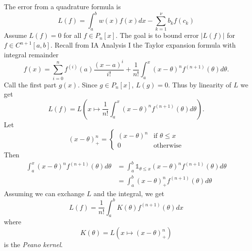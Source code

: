 \documentclass[a4paper]{article}
\begin{document}
The error from a quadrature formula is
\[
  L(f) = \int_a^b w(x)f(x) dx - \sum_{k = 1}^\nu b_kf(c_k)
\]
Assume \(L(f) = 0\) for all \(f \in P_n[x]\). The goal is to bound error \(|L(f)|\) for \(f \in C^{n + 1}[a, b]\). Recall from IA Analysis I the Taylor expansion formula with integral remainder
\[
  f(x) = \sum_{i = 0}^n f^{(i)}(a) \frac{(x - a)^i}{i!} + \frac{1}{n!} \int_a^x (x - \theta)^n f^{(n + 1)}(\theta) d\theta.
\]
Call the first part \(g(x)\). Since \(g \in P_n[x]\), \(L(g) = 0\). Thus by linearity of \(L\) we get
\[
  L(f) = L\left( x \mapsto \frac{1}{n!} \int_a^x (x - \theta)^n f^{(n + 1)}(\theta) d\theta \right).
\]
Let
\[
  (x - \theta)_+^n =
  \begin{cases}
    (x - \theta)^n & \text{if } \theta \leq x \\
    0 & \text{otherwise}
  \end{cases}
\]
Then
\begin{align*}
  \int_a^x (x - \theta)^n f^{(n + 1)}(\theta) d\theta & = \int_a^b 𝟙_{\theta \leq x} (x - \theta)^n f^{(n + 1)}(\theta) d\theta \\
                                                      &= \int_a^b (x - \theta)_+^n f^{(n + 1)}(\theta) d\theta
\end{align*}
Assuming we can exchange \(L\) and the integral, we get
\[
  L(f) = \frac{1}{n!} \int_a^b K(\theta)f^{(n + 1)}(\theta) dx
\]
where
\[
  K(\theta) = L(x \mapsto (x - \theta)_+^n)
\]
is the \emph{Peano kernel}.
\end{document}
